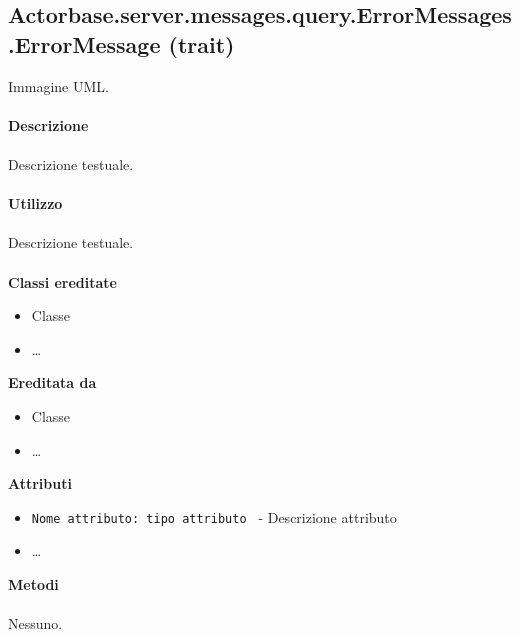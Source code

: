 \documentclass[a4paper]{article}
\begin{document}
	\subsection{Actorbase.server.messages.query.ErrorMessages.ErrorMessage (trait)}
		Immagine UML.
		\\ \\
		\textbf{Descrizione}
			\\ \\
			Descrizione testuale.
			\\ \\
		\textbf{Utilizzo}
			\\ \\
			Descrizione testuale.
			\\ \\
		\textbf{Classi ereditate}
			\begin{itemize}
				\item Classe
				\item \dots
			\end{itemize}
		\textbf{Ereditata da}
			\begin{itemize}
				\item Classe
				\item \dots
			\end{itemize}
		\textbf{Attributi}
			\begin{itemize}
				\item \texttt{Nome attributo: tipo attributo } - Descrizione attributo
				\item \dots
			\end{itemize}
		\textbf{Metodi}
			\\ \\
			Nessuno.
			
\end{document}
